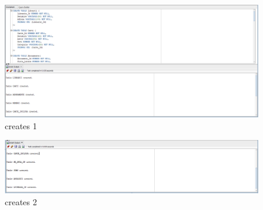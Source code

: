 \documentclass[12pt]{article}
\begin{document}
\begin{figure}[!htb]
	\includegraphics[max width=\linewidth]{imgs/creates1.png}
	\caption{creates 1}
	\label{fig:creates 1}
\end{figure}
\begin{figure}[!htb]
\includegraphics[max width=\linewidth]{imgs/creates2.png}
\caption{creates 2}
\label{fig:creates 2}
\end{figure}
\end{document}
